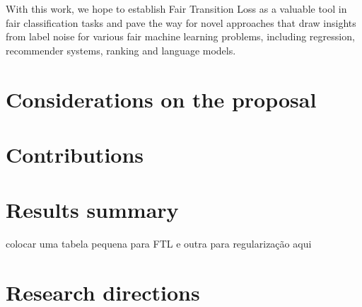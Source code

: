 With this work, we hope to establish Fair Transition Loss as a valuable tool in fair classification tasks and pave the way for novel approaches that draw insights from label noise for various fair machine learning problems, including regression, recommender systems, ranking and language models.

\section{Considerations on the proposal}

\section{Contributions}

\section{Results summary}

colocar uma tabela pequena para FTL e outra para regularização aqui

\section{Research directions}